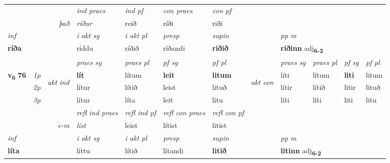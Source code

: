 \begin{longtable}[l]{X>{\footnotesize\itshape}llXXXXlXXXX}
   && &  \textit{ind praes} & \textit{ind pf} & \textit{con praes} & \textit{con pf} \\*
\multicolumn{3}{r}{\textit{það}} & ríður & reið & ríði & riði \\*

\cmidrule{4-7}
   {\textit{inf}} & &  & \textit{i akt sg} & \textit{i akt pl}   & \textit{presp} & \textit{supin}  && \textit{pp m} \\*
  {\textbf{ríða}} & && ríddu  & ríðið   & ríðandi &  \textbf{riðið}  && \multicolumn{2}{l}{\textbf{riðinn} adj\textbf{\textsubscript{6-2}}} \\*

\midrule

 & &   & \textit{praes sg}  & \textit{praes pl}    & \textit{ pf sg} & \textit{pf pl} & & \textit{praes sg}  & \textit{praes pl}    & \textit{pf sg} & \textit{pf pl }  \\ \cmidrule{4-7} \cmidrule{9-12}
 \multirow{2}{*}{{{\textbf{v{\textsubscript{6}}} \Large{\textbf{76}}}}}  & 1p & \multirow{3}{*}{\begin{turn}{90}\textit{akt ind}\end{turn}} & \textbf{lít} & lítum & \textbf{leit} & \textbf{litum} & \multirow{3}{*}{\begin{turn}{90}\textit{akt con}\end{turn}} &líti & lítum & \textbf{liti} & litum\\*
 & 2p &  &  lítur  & lítið & leist & lituð & & lítir & lítið & litir & lituð \\*
 & 3p &  & lítur & líta & leit & litu & & líti & líti& liti & litu \\*
\cmidrule{4-7} \cmidrule{9-12}

 & && \textit{refl ind praes} & \textit{refl ind pf} & \textit{refl con praes} & \textit{refl con pf} \\*
\multicolumn{3}{r}{\textit{e-m}}& líst & leist & lítist & litist \\*

\cmidrule{4-7}
   {\textit{inf}} & &  & \textit{i akt sg} & \textit{i akt pl}   & \textit{presp} & \textit{supin}  && \textit{pp m} \\*
  {\textbf{líta}} & && líttu  & lítið   & lítandi &  \textbf{litið}  && \multicolumn{2}{l}{\textbf{litinn} adj\textbf{\textsubscript{6-2}}} \\*

\midrule


\end{longtable}
